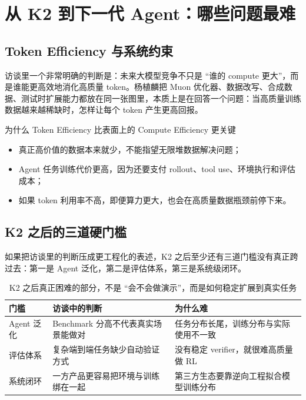 \section{从 K2 到下一代 Agent：哪些问题最难}

\subsection{Token Efficiency 与系统约束}
访谈里一个非常明确的判断是：未来大模型竞争不只是 ``谁的 compute 更大''，而是谁能更高效地消化高质量 token。杨植麟把 Muon 优化器、数据改写、合成数据、测试时扩展能力都放在同一张图里，本质上是在回答一个问题：当高质量训练数据越来越稀缺时，怎样让每个 token 产生更高回报。

\begin{importantbox}{为什么 Token Efficiency 比表面上的 Compute Efficiency 更关键}
\begin{itemize}
    \item 真正高价值的数据本来就少，不能指望无限堆数据解决问题；
    \item Agent 任务训练代价更高，因为还要支付 rollout、tool use、环境执行和评估成本；
    \item 如果 token 利用率不高，即便算力更大，也会在高质量数据瓶颈前停下来。
\end{itemize}
\end{importantbox}

\subsection{K2 之后的三道硬门槛}
如果把访谈里的判断压成更工程化的表述，K2 之后至少还有三道门槛没有真正跨过去：第一是 Agent 泛化，第二是评估体系，第三是系统级闭环。

\begin{table}[H]
\centering
\begin{tabular}{p{2.8cm}p{4.2cm}p{4.5cm}}
\toprule
\textbf{门槛} & \textbf{访谈中的判断} & \textbf{为什么难} \\
\midrule
Agent 泛化 & Benchmark 分高不代表真实场景能做对 & 任务分布长尾，训练分布与实际使用不一致 \\
评估体系 & 复杂端到端任务缺少自动验证方式 & 没有稳定 verifier，就很难高质量做 RL \\
系统闭环 & 一方产品更容易把环境与训练绑在一起 & 第三方生态要靠逆向工程拟合模型训练分布 \\
\bottomrule
\end{tabular}
\caption{K2 之后真正困难的部分，不是 ``会不会做演示''，而是如何稳定扩展到真实任务}
\end{table}

